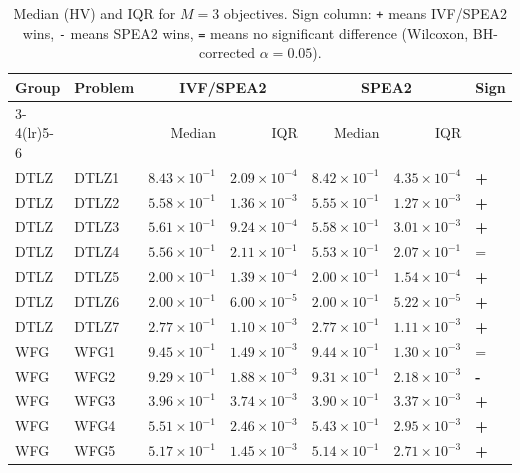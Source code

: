 \begin{table}[t]
\centering
\caption{Median (HV) and IQR for $M=3$ objectives. Sign column: \texttt{+} means IVF/SPEA2 wins, \texttt{-} means SPEA2 wins, \texttt{=} means no significant difference (Wilcoxon, BH-corrected $\alpha=0.05$).}
\label{tab:hv_m3_ivfspea2}
\scriptsize
\begin{tabular}{llrrrrl}
\toprule
Group & Problem & \multicolumn{2}{c}{IVF/SPEA2} & \multicolumn{2}{c}{SPEA2} & Sign \\
\cmidrule(lr){3-4}\cmidrule(lr){5-6}
 & & Median & IQR & Median & IQR & \\
\midrule
DTLZ & DTLZ1 & $8.43\!\times\!10^{-1}$ & $2.09\!\times\!10^{-4}$ & $8.42\!\times\!10^{-1}$ & $4.35\!\times\!10^{-4}$ & \textbf{+} \\
DTLZ & DTLZ2 & $5.58\!\times\!10^{-1}$ & $1.36\!\times\!10^{-3}$ & $5.55\!\times\!10^{-1}$ & $1.27\!\times\!10^{-3}$ & \textbf{+} \\
DTLZ & DTLZ3 & $5.61\!\times\!10^{-1}$ & $9.24\!\times\!10^{-4}$ & $5.58\!\times\!10^{-1}$ & $3.01\!\times\!10^{-3}$ & \textbf{+} \\
DTLZ & DTLZ4 & $5.56\!\times\!10^{-1}$ & $2.11\!\times\!10^{-1}$ & $5.53\!\times\!10^{-1}$ & $2.07\!\times\!10^{-1}$ & = \\
DTLZ & DTLZ5 & $2.00\!\times\!10^{-1}$ & $1.39\!\times\!10^{-4}$ & $2.00\!\times\!10^{-1}$ & $1.54\!\times\!10^{-4}$ & \textbf{+} \\
DTLZ & DTLZ6 & $2.00\!\times\!10^{-1}$ & $6.00\!\times\!10^{-5}$ & $2.00\!\times\!10^{-1}$ & $5.22\!\times\!10^{-5}$ & \textbf{+} \\
DTLZ & DTLZ7 & $2.77\!\times\!10^{-1}$ & $1.10\!\times\!10^{-3}$ & $2.77\!\times\!10^{-1}$ & $1.11\!\times\!10^{-3}$ & \textbf{+} \\
\addlinespace
WFG & WFG1 & $9.45\!\times\!10^{-1}$ & $1.49\!\times\!10^{-3}$ & $9.44\!\times\!10^{-1}$ & $1.30\!\times\!10^{-3}$ & = \\
WFG & WFG2 & $9.29\!\times\!10^{-1}$ & $1.88\!\times\!10^{-3}$ & $9.31\!\times\!10^{-1}$ & $2.18\!\times\!10^{-3}$ & \textbf{-} \\
WFG & WFG3 & $3.96\!\times\!10^{-1}$ & $3.74\!\times\!10^{-3}$ & $3.90\!\times\!10^{-1}$ & $3.37\!\times\!10^{-3}$ & \textbf{+} \\
WFG & WFG4 & $5.51\!\times\!10^{-1}$ & $2.46\!\times\!10^{-3}$ & $5.43\!\times\!10^{-1}$ & $2.95\!\times\!10^{-3}$ & \textbf{+} \\
WFG & WFG5 & $5.17\!\times\!10^{-1}$ & $1.45\!\times\!10^{-3}$ & $5.14\!\times\!10^{-1}$ & $2.71\!\times\!10^{-3}$ & \textbf{+} \\

\end{tabular}
\end{table}
